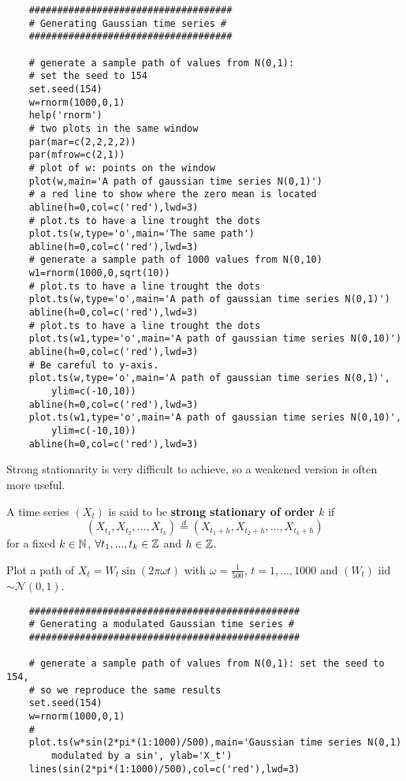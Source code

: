 \begin{verbatim}
    ####################################
    # Generating Gaussian time series #
    ####################################

    # generate a sample path of values from N(0,1): 
    # set the seed to 154
    set.seed(154)
    w=rnorm(1000,0,1)
    help('rnorm')
    # two plots in the same window
    par(mar=c(2,2,2,2))
    par(mfrow=c(2,1))
    # plot of w: points on the window
    plot(w,main='A path of gaussian time series N(0,1)')
    # a red line to show where the zero mean is located
    abline(h=0,col=c('red'),lwd=3)
    # plot.ts to have a line trought the dots
    plot.ts(w,type='o',main='The same path')
    abline(h=0,col=c('red'),lwd=3)
    # generate a sample path of 1000 values from N(0,10)
    w1=rnorm(1000,0,sqrt(10))
    # plot.ts to have a line trought the dots
    plot.ts(w,type='o',main='A path of gaussian time series N(0,1)')
    abline(h=0,col=c('red'),lwd=3)
    # plot.ts to have a line trought the dots
    plot.ts(w1,type='o',main='A path of gaussian time series N(0,10)')
    abline(h=0,col=c('red'),lwd=3)
    # Be careful to y-axis.
    plot.ts(w,type='o',main='A path of gaussian time series N(0,1)',
        ylim=c(-10,10))
    abline(h=0,col=c('red'),lwd=3)
    plot.ts(w1,type='o',main='A path of gaussian time series N(0,10)',
        ylim=c(-10,10))
    abline(h=0,col=c('red'),lwd=3)
\end{verbatim}

Strong stationarity is very difficult to achieve, so a weakened version is often more useful.

\begin{definition}
    A time series $(X_t)$ is said to be \textbf{strong stationary of order $k$} if
    \[
        \left(X_{t_1}, X_{t_2},...,X_{t_k}\right)\stackrel{d}{=}\left(X_{t_1+h}, X_{t_2+h},...,X_{t_k+h}\right)
    \]
    for a fixed $k\in\mathbb{N}$, $\forall t_1,...,t_k\in\mathbb{Z}$ and $h\in\mathbb{Z}$.
\end{definition}

\begin{example}
    Plot a path of $X_t=W_t\sin(2\pi\omega t)$ with $\omega=\frac{1}{500}$, $t=1,...,1000$ and $(W_t)$ iid $\sim\mathcal{N}(0,1)$.
    \begin{verbatim}
    ################################################
    # Generating a modulated Gaussian time series #
    ################################################
        
    # generate a sample path of values from N(0,1): set the seed to 154, 
    # so we reproduce the same results
    set.seed(154)
    w=rnorm(1000,0,1)
    #
    plot.ts(w*sin(2*pi*(1:1000)/500),main='Gaussian time series N(0,1) 
        modulated by a sin', ylab='X_t')
    lines(sin(2*pi*(1:1000)/500),col=c('red'),lwd=3)
    \end{verbatim}
\end{example}

